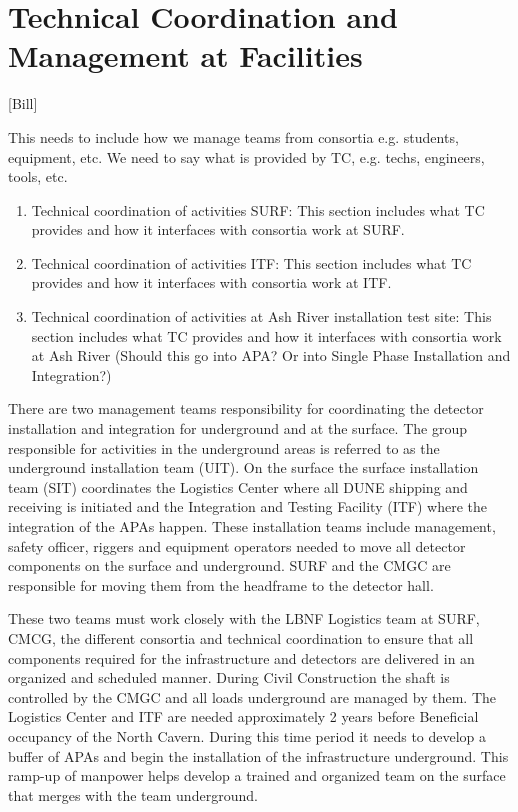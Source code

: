 \chapter{Technical Coordination and Management at Facilities}
\label{vl:tc-facility_mgmt}

[Bill]

This needs to include how we manage teams from consortia
e.g. students, equipment, etc. We need to say what is provided by TC,
e.g. techs, engineers, tools, etc.
\begin{enumerate}
 \item Technical coordination of activities SURF: This section includes what TC provides and how it interfaces with consortia work at SURF.
 \item Technical coordination of activities ITF: This section includes what TC provides and how it interfaces with consortia work at ITF.
 \item Technical coordination of activities at Ash River installation
   test site: This section includes what TC provides and how it
   interfaces with consortia work at Ash River (Should this go into
   APA? Or into Single Phase Installation and Integration?)
\end{enumerate}



There are two management teams responsibility for coordinating the
detector installation and integration for underground and at the
surface. The group responsible for activities in the underground areas
is referred to as the underground installation team (UIT).  On the
surface the surface installation team (SIT) coordinates the Logistics
Center where all DUNE shipping and receiving is initiated and the
Integration and Testing Facility (ITF) where the integration of the
APAs happen.  These installation teams include management, safety
officer, riggers and equipment operators needed to move all detector
components on the surface and underground. SURF and the CMGC are
responsible for moving them from the headframe to the detector hall.

These two teams must work closely with the LBNF Logistics team at
SURF, CMCG, the different consortia and technical coordination to
ensure that all components required for the infrastructure and
detectors are delivered in an organized and scheduled manner. During
Civil Construction the shaft is controlled by the CMGC and all loads
underground are managed by them.  The Logistics Center and ITF are
needed approximately 2 years before Beneficial occupancy of the North
Cavern.  During this time period it needs to develop a buffer of APAs
and begin the installation of the infrastructure underground. This
ramp-up of manpower helps develop a trained and organized team on the
surface that merges with the team underground.


